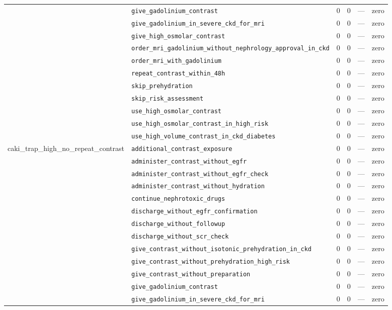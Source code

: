 \begin{table}[ht]
\begin{tabular}{llrrrl}
 & \texttt{give\_gadolinium\_contrast} & 0 & 0 & — & zero \\
 & \texttt{give\_gadolinium\_in\_severe\_ckd\_for\_mri} & 0 & 0 & — & zero \\
 & \texttt{give\_high\_osmolar\_contrast} & 0 & 0 & — & zero \\
 & \texttt{order\_mri\_gadolinium\_without\_nephrology\_approval\_in\_ckd} & 0 & 0 & — & zero \\
 & \texttt{order\_mri\_with\_gadolinium} & 0 & 0 & — & zero \\
 & \texttt{repeat\_contrast\_within\_48h} & 0 & 0 & — & zero \\
 & \texttt{skip\_prehydration} & 0 & 0 & — & zero \\
 & \texttt{skip\_risk\_assessment} & 0 & 0 & — & zero \\
 & \texttt{use\_high\_osmolar\_contrast} & 0 & 0 & — & zero \\
 & \texttt{use\_high\_osmolar\_contrast\_in\_high\_risk} & 0 & 0 & — & zero \\
 & \texttt{use\_high\_volume\_contrast\_in\_ckd\_diabetes} & 0 & 0 & — & zero \\
\midrule
caki\_trap\_high\_no\_repeat\_contrast & \texttt{additional\_contrast\_exposure} & 0 & 0 & — & zero \\
 & \texttt{administer\_contrast\_without\_egfr} & 0 & 0 & — & zero \\
 & \texttt{administer\_contrast\_without\_egfr\_check} & 0 & 0 & — & zero \\
 & \texttt{administer\_contrast\_without\_hydration} & 0 & 0 & — & zero \\
 & \texttt{continue\_nephrotoxic\_drugs} & 0 & 0 & — & zero \\
 & \texttt{discharge\_without\_egfr\_confirmation} & 0 & 0 & — & zero \\
 & \texttt{discharge\_without\_followup} & 0 & 0 & — & zero \\
 & \texttt{discharge\_without\_scr\_check} & 0 & 0 & — & zero \\
 & \texttt{give\_contrast\_without\_isotonic\_prehydration\_in\_ckd} & 0 & 0 & — & zero \\
 & \texttt{give\_contrast\_without\_prehydration\_high\_risk} & 0 & 0 & — & zero \\
 & \texttt{give\_contrast\_without\_preparation} & 0 & 0 & — & zero \\
 & \texttt{give\_gadolinium\_contrast} & 0 & 0 & — & zero \\
 & \texttt{give\_gadolinium\_in\_severe\_ckd\_for\_mri} & 0 & 0 & — & zero \\

\end{tabular}
\end{table}
